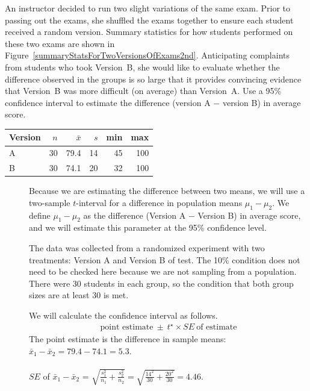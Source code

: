 \begin{examplewrap}
\label{twoexams}
\begin{nexample}
{
An instructor decided to run two slight variations of the same exam. Prior to passing out the exams, she shuffled the exams together to ensure each student received a random version. Summary statistics for how students performed on these two exams are shown in Figure~\ref{summaryStatsForTwoVersionsOfExams2nd}. Anticipating complaints from students who took Version~B, she would like to evaluate whether the difference observed in the groups is so large that it provides convincing evidence that Version~B was more difficult (on average) than Version~A.  Use a 95\% confidence interval to estimate the difference (version A $-$ version B) in average score.

\begin{center}
\begin{tabular}{l rrrrr}
\hline
Version\hspace{2mm}	& $n$	& $\bar{x}$	& $s$	& min	& max  \\
\hline
A		& 30		& 79.4		& 14 	& 45		& 100 \\
B		& 30		& 74.1		& 20		& 32		& 100 \\
\hline
\end{tabular}
\end{center}
\label{summaryStatsForTwoVersionsOfExams2nd}

}
\begin{description}
\item[] Because we are estimating the difference between two means, we will use a two-sample $t$-interval for a difference in population means $\mu_1 - \mu_2$. We define $\mu_1 - \mu_2$ as the difference (Version A $-$ Version B) in average score, and we will estimate this parameter at the 95\% confidence level.

\item[] The data was collected from a randomized experiment with two treatments:  Version A and Version B of test.   The 10\% condition does not need to be checked here because we are not sampling from a population.  There were 30 students in each group, so the condition that both group sizes are at least 30 is met.   
\item[]  We will calculate the confidence interval as follows.
\begin{align*}
\text{point estimate}\ \pm\ t^{\star} \times SE\ \text{of estimate}
\end{align*}
The point estimate is the difference in sample means: $\bar{x}_1-\bar{x}_2 = 79.4 - 74.1 = 5.3$.\\
\\
$SE$ of $\bar{x}_1-\bar{x}_2$ = $\sqrt{\frac{s_1^2}{n_1} + \frac{s_2^2}{n_2}} = \sqrt{\frac{14^2}{30} + \frac{20^2}{30}} = 4.46$. \\


\end{description}
\end{nexample}
\end{examplewrap}
